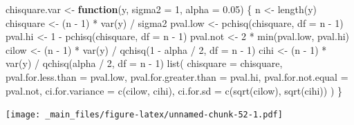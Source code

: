 \documentclass[
]{book}
\newenvironment{Shaded}{\begin{snugshade}}{\end{snugshade}}
\newcommand{\AttributeTok}[1]{\textcolor[rgb]{0.77,0.63,0.00}{#1}}
\newcommand{\ControlFlowTok}[1]{\textcolor[rgb]{0.13,0.29,0.53}{\textbf{#1}}}
\newcommand{\DecValTok}[1]{\textcolor[rgb]{0.00,0.00,0.81}{#1}}
\newcommand{\FloatTok}[1]{\textcolor[rgb]{0.00,0.00,0.81}{#1}}
\newcommand{\FunctionTok}[1]{\textcolor[rgb]{0.00,0.00,0.00}{#1}}
\newcommand{\NormalTok}[1]{#1}
\newcommand{\OtherTok}[1]{\textcolor[rgb]{0.56,0.35,0.01}{#1}}
\newcommand{\SpecialCharTok}[1]{\textcolor[rgb]{0.00,0.00,0.00}{#1}}
\begin{document}
\begin{Shaded}
\begin{Highlighting}[]
\NormalTok{chisquare.var }\OtherTok{\textless{}{-}} \ControlFlowTok{function}\NormalTok{(y, }\AttributeTok{sigma2 =} \DecValTok{1}\NormalTok{, }\AttributeTok{alpha =} \FloatTok{0.05}\NormalTok{) \{}
\NormalTok{  n }\OtherTok{\textless{}{-}} \FunctionTok{length}\NormalTok{(y)}
\NormalTok{  chisquare }\OtherTok{\textless{}{-}}\NormalTok{ (n }\SpecialCharTok{{-}} \DecValTok{1}\NormalTok{) }\SpecialCharTok{*} \FunctionTok{var}\NormalTok{(y) }\SpecialCharTok{/}\NormalTok{ sigma2}
\NormalTok{  pval.low }\OtherTok{\textless{}{-}} \FunctionTok{pchisq}\NormalTok{(chisquare, }\AttributeTok{df =}\NormalTok{ n }\SpecialCharTok{{-}} \DecValTok{1}\NormalTok{)}
\NormalTok{  pval.hi }\OtherTok{\textless{}{-}} \DecValTok{1} \SpecialCharTok{{-}} \FunctionTok{pchisq}\NormalTok{(chisquare, }\AttributeTok{df =}\NormalTok{ n }\SpecialCharTok{{-}} \DecValTok{1}\NormalTok{)}
\NormalTok{  pval.not }\OtherTok{\textless{}{-}} \DecValTok{2} \SpecialCharTok{*} \FunctionTok{min}\NormalTok{(pval.low, pval.hi)}
\NormalTok{  cilow }\OtherTok{\textless{}{-}}\NormalTok{ (n }\SpecialCharTok{{-}} \DecValTok{1}\NormalTok{) }\SpecialCharTok{*} \FunctionTok{var}\NormalTok{(y) }\SpecialCharTok{/} \FunctionTok{qchisq}\NormalTok{(}\DecValTok{1} \SpecialCharTok{{-}}\NormalTok{ alpha }\SpecialCharTok{/} \DecValTok{2}\NormalTok{, }\AttributeTok{df =}\NormalTok{ n }\SpecialCharTok{{-}} \DecValTok{1}\NormalTok{)}
\NormalTok{  cihi }\OtherTok{\textless{}{-}}\NormalTok{ (n }\SpecialCharTok{{-}} \DecValTok{1}\NormalTok{) }\SpecialCharTok{*} \FunctionTok{var}\NormalTok{(y) }\SpecialCharTok{/} \FunctionTok{qchisq}\NormalTok{(alpha }\SpecialCharTok{/} \DecValTok{2}\NormalTok{, }\AttributeTok{df =}\NormalTok{ n }\SpecialCharTok{{-}} \DecValTok{1}\NormalTok{)}
  \FunctionTok{list}\NormalTok{(}
    \AttributeTok{chisquare =}\NormalTok{ chisquare, }\AttributeTok{pval.for.less.than =}\NormalTok{ pval.low,}
    \AttributeTok{pval.for.greater.than =}\NormalTok{ pval.hi, }\AttributeTok{pval.for.not.equal =}\NormalTok{ pval.not,}
    \AttributeTok{ci.for.variance =} \FunctionTok{c}\NormalTok{(cilow, cihi), }\AttributeTok{ci.for.sd =} \FunctionTok{c}\NormalTok{(}\FunctionTok{sqrt}\NormalTok{(cilow), }\FunctionTok{sqrt}\NormalTok{(cihi))}
\NormalTok{  )}
\NormalTok{\}}
\end{Highlighting}
\end{Shaded}

\texttt{[image: \_main\_files/figure-latex/unnamed-chunk-52-1.pdf]}
\end{document}
